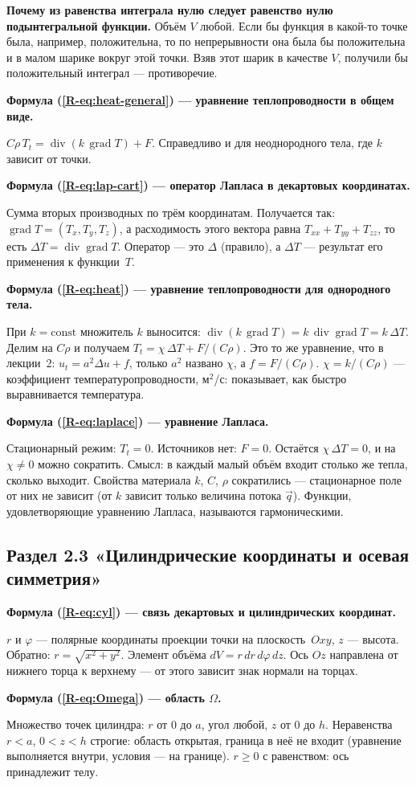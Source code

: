 \documentclass[a4paper,12pt]{article}
\renewcommand{\ge}{\geqslant}
\newcommand{\rf}[1]{(\ref*{R-#1})}
\DeclareMathOperator{\Div}{div}
\DeclareMathOperator{\Grad}{grad}
\newcommand{\fhead}[2]{\par\medskip\textbf{Формула #1 — #2.}\par\nopagebreak[4]}
\begin{document}
\textbf{Почему из равенства интеграла нулю следует равенство нулю
подынтегральной функции.} Объём $V$ любой. Если бы функция в какой-то точке
была, например, положительна, то по непрерывности она была бы положительна
и в малом шарике вокруг этой точки. Взяв этот шарик в качестве $V$, получили
бы положительный интеграл — противоречие.

\fhead{\rf{eq:heat-general}}{уравнение теплопроводности в общем виде}
$C\rho\,T_t=\Div(k\,\Grad T)+F$. Справедливо и для неоднородного тела, где
$k$ зависит от точки.

\fhead{\rf{eq:lap-cart}}{оператор Лапласа в декартовых координатах}
Сумма вторых производных по трём координатам. Получается так:
$\Grad T=(T_x,T_y,T_z)$, а расходимость этого вектора равна
$T_{xx}+T_{yy}+T_{zz}$, то есть $\Delta T=\Div\Grad T$. Оператор — это
$\Delta$ (правило), а $\Delta T$ — результат его применения к функции~$T$.

\fhead{\rf{eq:heat}}{уравнение теплопроводности для однородного тела}
При $k=\mathrm{const}$ множитель $k$ выносится:
$\Div(k\,\Grad T)=k\,\Div\Grad T=k\,\Delta T$. Делим на $C\rho$ и получаем
$T_t=\chi\,\Delta T+F/(C\rho)$. Это то же уравнение, что в лекции~2:
$u_t=a^2\Delta u+f$, только $a^2$ названо $\chi$, а $f=F/(C\rho)$.
$\chi=k/(C\rho)$ — коэффициент температуропроводности, м$^2$/с: показывает,
как быстро выравнивается температура.

\fhead{\rf{eq:laplace}}{уравнение Лапласа}
Стационарный режим: $T_t=0$. Источников нет: $F=0$. Остаётся
$\chi\,\Delta T=0$, и на $\chi\ne0$ можно сократить. Смысл: в каждый малый
объём входит столько же тепла, сколько выходит. Свойства материала $k$, $C$,
$\rho$ сократились — стационарное поле от них не зависит (от $k$ зависит
только величина потока $\vec q$). Функции, удовлетворяющие уравнению
Лапласа, называются гармоническими.

\subsection{Раздел 2.3 «Цилиндрические координаты и осевая симметрия»}

\fhead{\rf{eq:cyl}}{связь декартовых и цилиндрических координат}
$r$ и $\varphi$ — полярные координаты проекции точки на плоскость~$Oxy$,
$z$ — высота. Обратно: $r=\sqrt{x^2+y^2}$. Элемент объёма
$dV=r\,dr\,d\varphi\,dz$. Ось $Oz$ направлена от нижнего торца к верхнему —
от этого зависит знак нормали на торцах.

\fhead{\rf{eq:Omega}}{область $\Omega$}
Множество точек цилиндра: $r$ от 0 до $a$, угол любой, $z$ от 0 до $h$.
Неравенства $r<a$, $0<z<h$ строгие: область открытая, граница в неё не
входит (уравнение выполняется внутри, условия — на границе). $r\ge0$ с
равенством: ось принадлежит телу.
\end{document}
